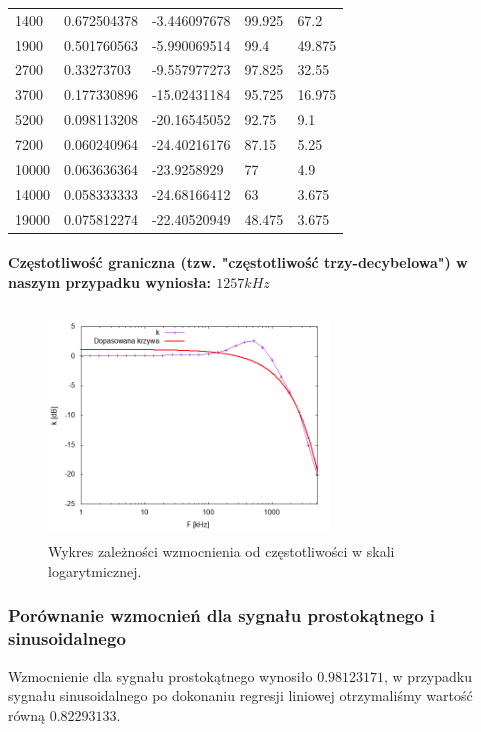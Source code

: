\documentclass[a4paper,12pt]{article}
\begin{document}
\begin{justify}
\begin{center}
\begin{tabular}{ |p{3cm}|p{3cm}|p{3cm}|p{3cm}|p{3cm}| }
1400 & 0.672504378 & -3.446097678 & 99.925 & 67.2 \\
1900 & 0.501760563 & -5.990069514 & 99.4 & 49.875 \\
2700 & 0.33273703 & -9.557977273 & 97.825 & 32.55 \\
3700 & 0.177330896 & -15.02431184 & 95.725 & 16.975 \\
5200 & 0.098113208 & -20.16545052 & 92.75 & 9.1 \\
7200 & 0.060240964 & -24.40216176 & 87.15 & 5.25 \\
10000 & 0.063636364 & -23.9258929 & 77 & 4.9 \\
14000 & 0.058333333 & -24.68166412 & 63 & 3.675 \\
19000 & 0.075812274 & -22.40520949 & 48.475 & 3.675 \\
\hline
\end{tabular}
\end{center}

\paragraph{Częstotliwość graniczna (tzw. "częstotliwość trzy-decybelowa") w naszym przypadku wyniosła: $1257 kHz$}

\begin{figure}[h]
\centering
\includegraphics[width=7.5cm, height=6cm]{plot_wtornik_napieciowy_sin}
\caption{Wykres zależności wzmocnienia od częstotliwości w skali logarytmicznej.}
\end{figure}

\newpage

\subsubsection{Porównanie wzmocnień dla sygnału prostokątnego i sinusoidalnego}

Wzmocnienie dla sygnału prostokątnego wynosiło $0.98123171$, w przypadku sygnału sinusoidalnego po dokonaniu regresji liniowej otrzymaliśmy wartość równą $0.82293133$.


\end{justify}
\end{document}
